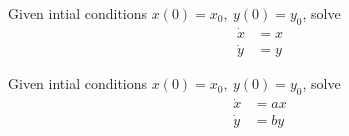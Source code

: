 \begin{enumerate}
\qitem Given intial conditions $x(0) = x_0,\ y(0) = y_0$, solve
    \begin{align*}
        \dot{x} &= x \\
        \dot{y} &= y
    \end{align*}


\qitem Given intial conditions $x(0) = x_0,\ y(0) = y_0$, solve
    \begin{align*}
        \dot{x} &= ax \\
        \dot{y} &= by
    \end{align*}







\end{enumerate}